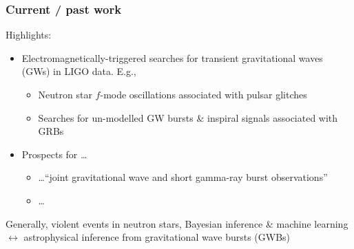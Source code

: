 \documentclass{beamer}
\def\gw#1{gravitational wave#1 (GW#1)\gdef\gw{GW}}
\def\gwb#1{gravitational wave burst#1 (GWB#1)\gdef\gwb{GWB}}
\newcommand{\red}[1]{{\color{red}{#1}}}
\begin{document}
\begin{frame}
    \frametitle{Current / past work}
    Highlights:
    \begin{itemize}
        \item Electromagnetically-triggered searches for transient \gw{s} in LIGO data.
            E.g.,
            \begin{itemize}
                \item Neutron star $f$-mode oscillations associated with pulsar
                    glitches~\cite{s5velaglitch-paper}
                \item Searches for un-modelled GW bursts \& inspiral signals
                    associated with
                    GRBs~\cite{2012arXiv1201.4413T,0004-637X-760-1-12}
            \end{itemize}
        \item Prospects for \dots
            \begin{itemize}
                \item \dots ``joint gravitational wave and short gamma-ray burst
                    observations''~\cite{2014arXiv1409.8149C}
                \item \dots \red{``high frequency burst searches following binary
                    neutron star coalescence with advanced gravitational wave
                detectors''}~\cite{clark:14}
            \end{itemize}
    \end{itemize}

        Generally, violent events in neutron stars, Bayesian inference \&
    machine learning $\leftrightarrow$ astrophysical inference from \gwb{s}

\end{frame}


\end{document}
